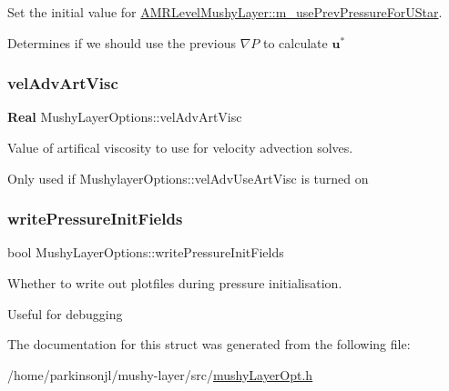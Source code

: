 Set the initial value for \hyperlink{class_a_m_r_level_mushy_layer_af6dd293bd80f201846fc7d6fe6f851b1}{A\+M\+R\+Level\+Mushy\+Layer\+::m\+\_\+use\+Prev\+Pressure\+For\+U\+Star}. 

Determines if we should use the previous $ \nabla P $ to calculate $ \mathbf{u}^* $ \mbox{\label{struct_mushy_layer_options_a9c2d1485bfcf48a0b18a07861ea5a3b8}} 
\subsubsection{\texorpdfstring{vel\+Adv\+Art\+Visc}{velAdvArtVisc}}
{\footnotesize\ttfamily \textbf{ Real} Mushy\+Layer\+Options\+::vel\+Adv\+Art\+Visc}



Value of artifical viscosity to use for velocity advection solves. 

Only used if Mushylayer\+Options\+::vel\+Adv\+Use\+Art\+Visc is turned on \mbox{\label{struct_mushy_layer_options_a7ed9632c43355a63ee6e4252145e5435}} 
\subsubsection{\texorpdfstring{write\+Pressure\+Init\+Fields}{writePressureInitFields}}
{\footnotesize\ttfamily bool Mushy\+Layer\+Options\+::write\+Pressure\+Init\+Fields}



Whether to write out plotfiles during pressure initialisation. 

Useful for debugging 

The documentation for this struct was generated from the following file\+:\begin{DoxyCompactItemize}
\item 
/home/parkinsonjl/mushy-\/layer/src/\hyperlink{mushy_layer_opt_8h}{mushy\+Layer\+Opt.\+h}\end{DoxyCompactItemize}

